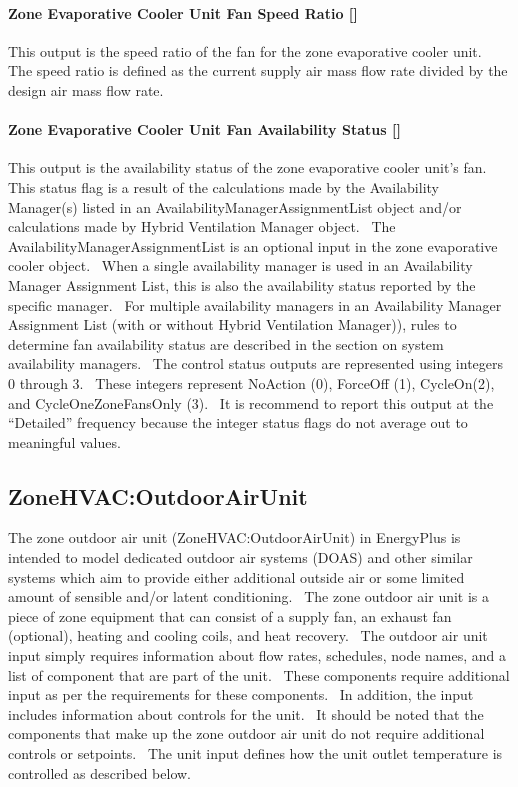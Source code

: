 \paragraph{Zone Evaporative Cooler Unit Fan Speed Ratio {[]}}\label{zone-evaporative-cooler-unit-fan-speed-ratio}

This output is the speed ratio of the fan for the zone evaporative cooler unit.~ The speed ratio is defined as the current supply air mass flow rate divided by the design air mass flow rate.

\paragraph{Zone Evaporative Cooler Unit Fan Availability Status {[]}}\label{zone-evaporative-cooler-unit-fan-availability-status}

This output is the availability status of the zone evaporative cooler unit's fan.~ This status flag is a result of the calculations made by the Availability Manager(s) listed in an AvailabilityManagerAssignmentList object and/or calculations made by Hybrid Ventilation Manager object.~ The AvailabilityManagerAssignmentList is an optional input in the zone evaporative cooler object.~ When a single availability manager is used in an Availability Manager Assignment List, this is also the availability status reported by the specific manager.~ For multiple availability managers in an Availability Manager Assignment List (with or without Hybrid Ventilation Manager)), rules to determine fan availability status are described in the section on system availability managers.~ The control status outputs are represented using integers 0 through 3.~ These integers represent NoAction (0), ForceOff (1), CycleOn(2), and CycleOneZoneFansOnly (3).~ It is recommend to report this output at the ``Detailed'' frequency because the integer status flags do not average out to meaningful values.

\subsection{ZoneHVAC:OutdoorAirUnit}\label{zonehvacoutdoorairunit}

The zone outdoor air unit (ZoneHVAC:OutdoorAirUnit) in EnergyPlus is intended to model dedicated outdoor air systems (DOAS) and other similar systems which aim to provide either additional outside air or some limited amount of sensible and/or latent conditioning.~ The zone outdoor air unit is a piece of zone equipment that can consist of a supply fan, an exhaust fan (optional), heating and cooling coils, and heat recovery.~ The outdoor air unit input simply requires information about flow rates, schedules, node names, and a list of component that are part of the unit.~ These components require additional input as per the requirements for these components.~ In addition, the input includes information about controls for the unit.~ It should be noted that the components that make up the zone outdoor air unit do not require additional controls or setpoints.~ The unit input defines how the unit outlet temperature is controlled as described below.

